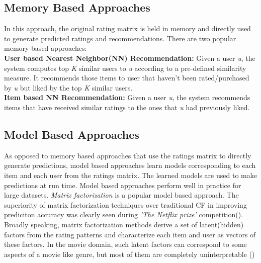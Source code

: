 \subsection {Memory Based Approaches}
In this approach, the original rating matrix is held in memory and directly used to generate predicted ratings and recommendations. There are two popular memory based approaches:\\
\textbf{User based Nearest Neighbor(NN) Recommendation:} Given a user \textit{u}, the system computes top \textit{K} similar users to \textit{u} according to a pre-defined similarity measure. It recommends those items to user that haven't been rated/purchased by \textit{u} but liked by the top \textit{K} similar users.\\
\textbf{Item based NN Recommendation:} Given a user \textit{u}, the system recommends items that have received similar ratings to the ones that \textit{u} had previously liked.
 


\subsection {Model Based Approaches}
As opposed to memory based approaches that use the ratings matrix to directly generate predictions, model based approaches learn models corresponding to each item and each user from the ratings matrix. The learned models are used to make predictions at run time.
Model based approaches perform well in practice for large datasets.
\textit{Matrix factorization} is a popular model based approach. The superiority of matrix factorization techniques over traditional CF in improving prediciton accuracy was clearly seen during \textit{'The Netflix prize'} competition(\cite{koren}).
Broadly speaking, matrix factorization methods derive a set of latent(hidden) factors from the rating patterns and characterize each item and user as vectors of these factors.
In the movie domain, such latent factors can correspond to some aspects of a movie like genre, but most of them are completely uninterpretable (\cite{koren})


